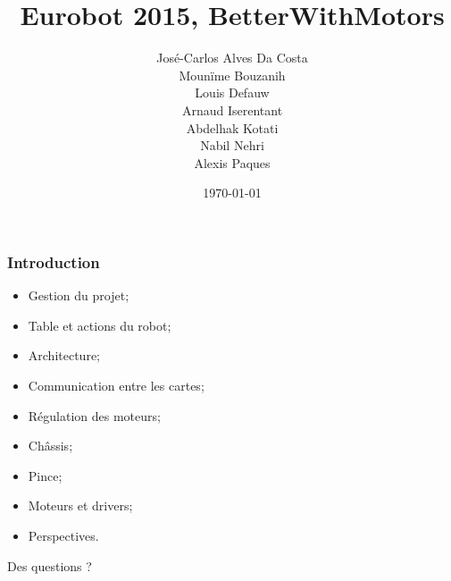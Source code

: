 \documentclass{beamer}
\title{{\huge Eurobot 2015, BetterWithMotors}}
\author{José-Carlos Alves Da Costa\\
	Mounïme Bouzanih\\
	Louis Defauw\\
	Arnaud Iserentant\\
	Abdelhak Kotati\\
	Nabil Nehri\\
	Alexis Paques}
\date{\today}
\begin{document}
\maketitle

\begin{frame}
\frametitle{Introduction}
\begin{itemize}
	\item Gestion du projet;
	\item Table et actions du robot;
	\item Architecture;
	\item Communication entre les cartes;
	\item Régulation des moteurs;
	\item Châssis;
	\item Pince;
	\item Moteurs et drivers;
	\item Perspectives.
\end{itemize}
\end{frame}











\begin{frame}
\begin{center}
{\Huge Des questions ?}
\end{center}
\end{frame}
\end{document}
